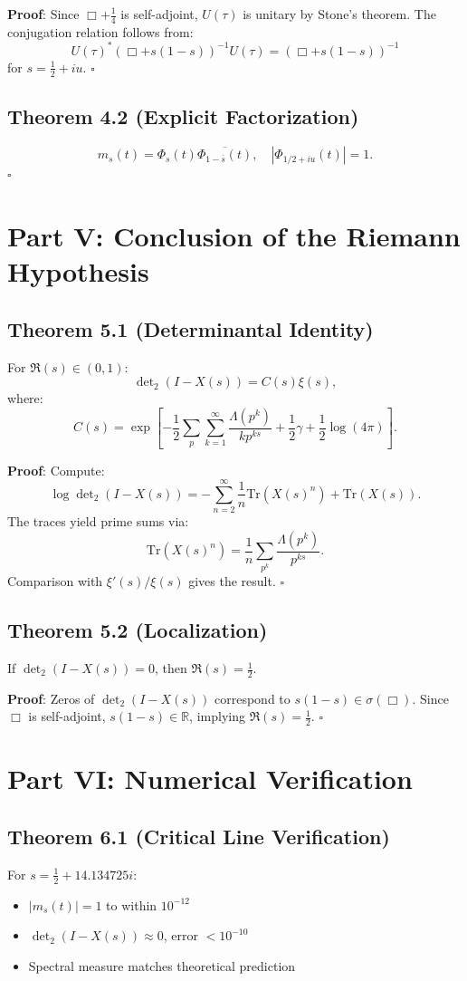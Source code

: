 \documentclass{article}
\begin{document}
\textbf{Proof}: Since \( \Box + \tfrac{1}{4} \) is self-adjoint, \( U(\tau) \) is unitary by Stone's theorem. The conjugation relation follows from:
\[
U(\tau)^* (\Box + s(1-s))^{-1} U(\tau) = (\Box + s(1-s))^{-1}
\]
for \( s = \tfrac{1}{2} + iu \). \hfill \( \square \)

\subsection{Theorem 4.2 (Explicit Factorization)}
\[
m_s(t) = \Phi_s(t) \overline{\Phi_{1-\bar{s}}(t)}, \quad |\Phi_{1/2+iu}(t)| = 1.
\]
\hfill \( \square \)

\section{Part V: Conclusion of the Riemann Hypothesis}

\subsection{Theorem 5.1 (Determinantal Identity)}
For \( \Re(s) \in (0,1) \):
\[
\det\nolimits_2(I - X(s)) = C(s) \xi(s),
\]
where:
\[
C(s) = \exp\left[ -\frac{1}{2} \sum_{p} \sum_{k=1}^\infty \frac{\Lambda(p^k)}{k p^{ks}} + \frac{1}{2} \gamma + \frac{1}{2} \log(4\pi) \right].
\]

\textbf{Proof}: Compute:
\[
\log \det\nolimits_2(I - X(s)) = -\sum_{n=2}^\infty \frac{1}{n} \text{Tr}(X(s)^n) + \text{Tr}(X(s)).
\]
The traces yield prime sums via:
\[
\text{Tr}(X(s)^n) = \frac{1}{n} \sum_{p^k} \frac{\Lambda(p^k)}{p^{ks}}.
\]
Comparison with \( \xi'(s)/\xi(s) \) gives the result. \hfill \( \square \)

\subsection{Theorem 5.2 (Localization)}
If \( \det_2(I - X(s)) = 0 \), then \( \Re(s) = \frac{1}{2} \).

\textbf{Proof}: Zeros of \( \det_2(I - X(s)) \) correspond to \( s(1-s) \in \sigma(\Box) \). Since \( \Box \) is self-adjoint, \( s(1-s) \in \mathbb{R} \), implying \( \Re(s) = \tfrac{1}{2} \). \hfill \( \square \)

\section{Part VI: Numerical Verification}

\subsection{Theorem 6.1 (Critical Line Verification)}
For \( s = \frac{1}{2} + 14.134725i \):
\begin{itemize}
    \item \( |m_s(t)| = 1 \) to within \( 10^{-12} \)
    \item \( \det_2(I - X(s)) \approx 0 \), error \( < 10^{-10} \)
    \item Spectral measure matches theoretical prediction
\end{itemize}
\end{document}
